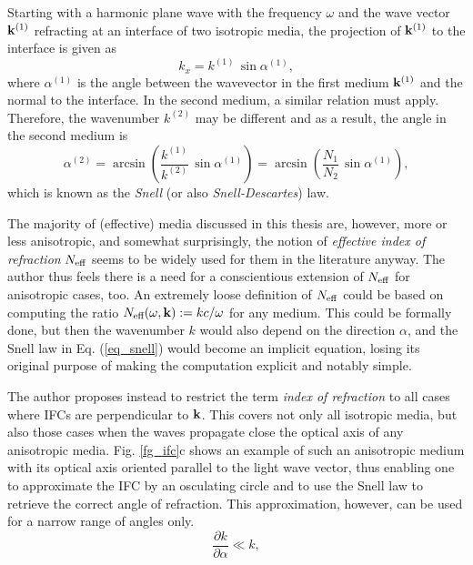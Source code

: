 Starting with a harmonic plane wave with the frequency $\omega$ and the wave vector ${\mathbf{k}}^{(1)}$ refracting at an interface of two isotropic media, the projection of ${\mathbf{k}}^{(1)}$ to the interface is given as 
$$ k_x = k^{(1)}\,\sin \alpha^{(1)}, $$
where $\alpha^{(1)}$ is the angle between the wavevector in the first medium ${\mathbf{k}}^{(1)}$ and the  normal to the interface. In the second medium, a similar relation must apply. Therefore, the wavenumber $k^{(2)}$ may be different and as a result, the angle in the second medium is
\begin{equation} \alpha^{(2)} = \arcsin\left( \frac{k^{(1)}}{k^{(2)}} \,\sin \alpha^{(1)} \right) = \arcsin\left( \frac{N_1}{N_2} \,\sin \alpha^{(1)} \right), \label{eq_snell}\end{equation}
which is known as the \textit{Snell} (or also \textit{Snell-Descartes}) law.

The majority of (effective) media discussed in this thesis are, however, more or less anisotropic, and somewhat surprisingly, the notion of \textit{effective index of refraction} $N_{\text{eff} }$ seems to be widely used for them in the literature anyway. The author thus feels there is a need for a conscientious extension of $N_{\text{eff} }$ for anisotropic cases, too. An extremely loose definition of $N_{\text{eff} }$ could be based on computing the ratio $N_{\text{eff} }(\omega, {\mathbf{k}}) := kc/\omega$  for any medium. This could be formally done, but then the wavenumber $k$ would also depend on the direction $\alpha$, and the Snell law in Eq. (\ref{eq_snell}) would become an implicit equation, losing its original purpose of making the computation explicit and notably simple.

The author proposes instead to restrict the term \textit{index of refraction} to all cases where IFCs are perpendicular to ${\mathbf{k}}$. This covers not only all isotropic media, but also those cases when the waves propagate close the optical axis of any anisotropic media. Fig. \ref{fg_ifc}c shows an example of such an anisotropic medium with its optical axis oriented parallel to the light wave vector, thus enabling one to approximate the IFC by an osculating circle and to use the Snell law to retrieve the correct angle of refraction. This approximation, however, can be used for a narrow range of angles only.
\begin{equation} \frac{\partial k}{\partial \alpha} \ll k,\label{eq_osculating}\end{equation}


